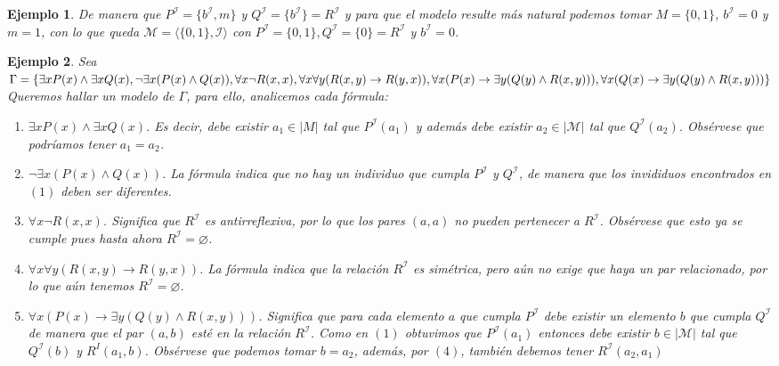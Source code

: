 \documentclass[letterpaper,12pt]{article}
\newtheorem{ejem}{Ejemplo}[]
\begin{document}
\begin{ejem}
      De manera que $P^{\mathcal{I}} = \{ b^{\mathcal{I}}, m\}$ y 
      $Q^{\mathcal{I}} = \{b^{\mathcal{I}}\} = R^{\mathcal{I}}$ y para que 
      el modelo resulte más natural podemos tomar $M = \{0,1\}$, 
      $b^{\mathcal{I}} = 0$ y $m = 1$, con lo que queda 
      $\mathcal{M} = \langle \{0,1\}, \mathcal{I} \rangle$ con 
      $P^{\mathcal{I}} = \{0,1\}, Q^{\mathcal{I}} = \{0\} = R^{\mathcal{I}}$ y
      $b^{\mathcal{I}} = 0$. 
    \end{ejem}

    \begin{ejem}
      Sea $\Gamma = \{\exists x P(x) \land \exists x Q(x), 
      \neg \exists x(P(x) \land Q(x)), \forall x \neg R(x,x), 
      \forall x \forall y(R(x,y) \rightarrow R(y,x)), \\
      \forall x (P(x) \rightarrow \exists y (Q(y) \land R(x,y))),
      \forall x (Q(x) \rightarrow \exists y (Q(y) \land R(x,y)))\}$ \\
      Queremos hallar un modelo de $\Gamma$, para ello, analicemos cada 
      fórmula:
      \begin{enumerate}
        \item $\exists x P(x) \land \exists x Q(x)$. Es decir, debe existir 
        $a_{1} \in |M|$ tal que $P^{\mathcal{I}}(a_{1})$ y además debe 
        existir $a_{2} \in |\mathcal{M}|$ tal que $Q^{\mathcal{I}}(a_{2})$.
        Obsérvese que podríamos tener $a_{1} = a_{2}$.

        \item $\neg \exists x(P(x) \land Q(x))$. La fórmula indica que no hay
        un individuo que cumpla $P^{\mathcal{I}}$ y $Q^{\mathcal{I}}$, de 
        manera que los invididuos encontrados en $(1)$ deben ser diferentes.

        \item $\forall x \neg R(x,x)$. Significa que $R^{\mathcal{I}}$ es 
        antirreflexiva, por lo que los pares $(a,a)$ no pueden pertenecer a 
        $R^{\mathcal{I}}$. Obsérvese que esto ya se cumple pues hasta ahora 
        $R^{\mathcal{I}} = \varnothing$.

        \item $\forall x \forall y(R(x,y) \rightarrow R(y,x))$. La fórmula 
        indica que la relación $R^{\mathcal{I}}$ es simétrica, pero aún no 
        exige que haya un par relacionado, por lo que aún tenemos 
        $R^{\mathcal{I}} = \varnothing$.

        \item $\forall x (P(x) \rightarrow \exists y (Q(y) \land R(x,y)))$.
        Significa que para cada elemento $a$ que cumpla $P^{\mathcal{I}}$
        debe existir un elemento $b$ que cumpla $Q^\mathcal{I}$ de manera 
        que el par $(a,b)$ esté en la relación $R^{\mathcal{I}}$. Como en 
        $(1)$ obtuvimos que $P^{\mathcal{I}}(a_{1})$ entonces debe existir
        $b \in |\mathcal{M}|$ tal que $Q^{\mathcal{I}}(b)$ y 
        $R^{I}(a_{1}, b)$. Obsérvese que podemos tomar $b = a_{2}$, además, 
        por $(4)$, también debemos tener $R^{\mathcal{I}}(a_{2}, a_{1})$


\end{enumerate}
\end{ejem}
\end{document}
